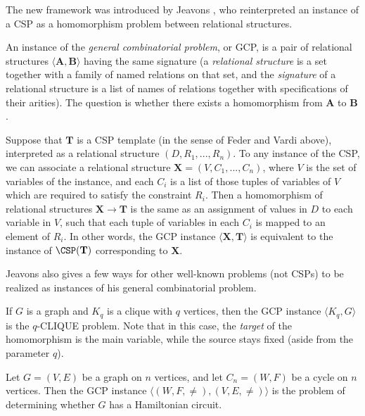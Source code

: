 The new framework was introduced by Jeavons \cite{jeavons}, who reinterpreted an instance of a CSP as a homomorphism problem between relational structures.

\begin{defn} An instance of the \emph{general combinatorial problem}, or GCP, is a pair of relational structures $\langle \mathbf{A},\mathbf{B}\rangle$ having the same signature (a \emph{relational structure} is a set together with a family of named relations on that set, and the \emph{signature} of a relational structure is a list of names of relations together with specifications of their arities). The question is whether there exists a homomorphism from $\mathbf{A}$ to $\mathbf{B}$.
\end{defn}

\begin{ex} Suppose that $\mathbf{T}$ is a CSP template (in the sense of Feder and Vardi above), interpreted as a relational structure $(D, R_1, ..., R_n)$. To any instance of the CSP, we can associate a relational structure $\mathbf{X} = (V, C_1, ..., C_n)$, where $V$ is the set of variables of the instance, and each $C_i$ is a list of those tuples of variables of $V$ which are required to satisfy the constraint $R_i$. Then a homomorphism of relational structures $\mathbf{X} \rightarrow \mathbf{T}$ is the same as an assignment of values in $D$ to each variable in $V$, such that each tuple of variables in each $C_i$ is mapped to an element of $R_i$. In other words, the GCP instance $\langle \mathbf{X}, \mathbf{T}\rangle$ is equivalent to the instance of $\CSP(\mathbf{T})$ corresponding to $\mathbf{X}$.
\end{ex}

Jeavons also gives a few ways for other well-known problems (not CSPs) to be realized as instances of his general combinatorial problem.

\begin{ex} If $G$ is a graph and $K_q$ is a clique with $q$ vertices, then the GCP instance $\langle K_q, G\rangle$ is the $q$-CLIQUE problem. Note that in this case, the \emph{target} of the homomorphism is the main variable, while the source stays fixed (aside from the parameter $q$).
\end{ex}

\begin{ex} Let $G = (V,E)$ be a graph on $n$ vertices, and let $C_n = (W,F)$ be a cycle on $n$ vertices. Then the GCP instance $\langle (W,F,\ne), (V,E,\ne)\rangle$ is the problem of determining whether $G$ has a Hamiltonian circuit.
\end{ex}

